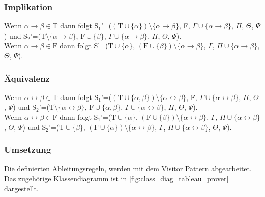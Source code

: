 \subsubsection{Implikation}
Wenn $\alpha\rightarrow\beta\in\textrm{T}$ dann folgt S$_{1}$'=($(\textrm{T}\cup\lbrace\alpha\rbrace)\setminus\lbrace\alpha\rightarrow\beta\rbrace$, F, $\Gamma\cup\lbrace\alpha\rightarrow\beta\rbrace$, $\Pi$, $\Theta$, $\Psi$) und S$_{2}$'=($\textrm{T}\setminus\lbrace\alpha\rightarrow\beta\rbrace$, $\textrm{F}\cup\lbrace\beta\rbrace$, $\Gamma\cup\lbrace\alpha\rightarrow\beta\rbrace$, $\Pi$, $\Theta$, $\Psi$).\\
Wenn $\alpha\rightarrow\beta\in\textrm{F}$ dann folgt S'=($\textrm{T}\cup\lbrace\alpha\rbrace$, $(\textrm{F}\cup\lbrace\beta\rbrace)\setminus\lbrace\alpha\rightarrow\beta\rbrace$, $\Gamma$, $\Pi\cup\lbrace\alpha\rightarrow\beta\rbrace$, $\Theta$, $\Psi$).

\subsubsection{Äquivalenz}
Wenn $\alpha\leftrightarrow\beta\in\textrm{T}$ dann folgt S$_{1}$'=($(\textrm{T}\cup\lbrace\alpha,\beta\rbrace)\setminus\lbrace\alpha\leftrightarrow\beta\rbrace$, F, $\Gamma\cup\lbrace\alpha\leftrightarrow\beta\rbrace$, $\Pi$, $\Theta$, $\Psi$) und S$_{2}$'=($\textrm{T}\setminus\lbrace\alpha\leftrightarrow\beta\rbrace$, $\textrm{F}\cup\lbrace\alpha,\beta\rbrace$, $\Gamma\cup\lbrace\alpha\leftrightarrow\beta\rbrace$, $\Pi$, $\Theta$, $\Psi$).\\
Wenn $\alpha\leftrightarrow\beta\in\textrm{F}$ dann folgt S$_{1}$'=($\textrm{T}\cup\lbrace\alpha\rbrace$, $(\textrm{F}\cup\lbrace\beta\rbrace)\setminus\lbrace\alpha\leftrightarrow\beta\rbrace$, $\Gamma$, $\Pi\cup\lbrace\alpha\leftrightarrow\beta\rbrace$, $\Theta$, $\Psi$) und S$_{2}$'=($\textrm{T}\cup\lbrace\beta\rbrace$, $(\textrm{F}\cup\lbrace\alpha\rbrace)\setminus\lbrace\alpha\leftrightarrow\beta\rbrace$, $\Gamma$, $\Pi\cup\lbrace\alpha\leftrightarrow\beta\rbrace$, $\Theta$, $\Psi$).

\subsubsection{Umsetzung}
Die definierten Ableitungsregeln, werden mit dem Visitor Pattern abgearbeitet. \cite{gof_design_patterns} Das zugehörige Klassendiagramm ist in \autoref{fig:class_diag_tableau_prover} dargestellt.

